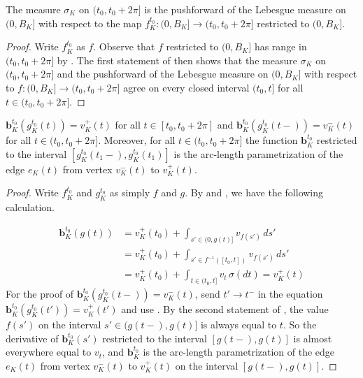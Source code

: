 \begin{lemma}

The measure \(\sigma_K\) on \((t_0, t_0 + 2 \pi]\) is the pushforward of the Lebesgue measure on \((0, B_K]\) with respect to the map \(f_{K}^{t_0} : (0, B_K] \to (t_0, t_0 + 2 \pi]\) restricted to \((0, B_K]\).

\label{lem:parametrization-pushforward}
\end{lemma}

\begin{proof}
Write \(f_K^{t_0}\) as \(f\). Observe that \(f\) restricted to \((0, B_K]\) has range in \((t_0, t_0 + 2\pi]\) by . The first statement of  then shows that the measure \(\sigma_K\) on \((t_0, t_0 + 2 \pi]\) and the pushforward of the Lebesgue measure on \((0, B_K]\) with respect to \(f : (0, B_K] \to (t_0, t_0 + 2 \pi]\) agree on every closed interval \((t_0, t]\) for all \(t \in (t_0, t_0 + 2\pi]\).
\end{proof}

\begin{lemma}

\(\mathbf{b}_{K}^{t_0}(g_{K}^{t_0}(t)) = v_{K}^+(t)\) for all \(t \in [t_0, t_0 + 2\pi]\) and \(\mathbf{b}_{K}^{t_0}(g_{K}^{t_0}(t-)) = v_{K}^-(t)\) for all \(t \in (t_0, t_0 + 2\pi]\). Moreover, for all \(t \in (t_0, t_0 + 2\pi]\) the function \(\mathbf{b}_{K}^{t_0}\) restricted to the interval \([g_{K}^{t_0}(t_1-), g_{K}^{t_0}(t_1)]\) is the arc-length parametrization of the edge \(e_K(t)\) from vertex \(v_K^-(t)\) to \(v_K^+(t)\).

\label{lem:parametrization-vertex}
\end{lemma}

\begin{proof}
Write \(f_K^{t_0}\) and \(g_K^{t_0}\) as simply \(f\) and \(g\). By  and , we have the following calculation.

\begin{align*}
\mathbf{b}_{K}^{t_0} (g(t)) & = v_K^+(t_0) + \int_{s' \in (0, g(t)]} v_{f(s')} \, ds' \\
& = v_K^+(t_0) + \int_{s' \in f^{-1}([t_0, t])} v_{f(s')} \, ds' \\
& = v_K^+(t_0) + \int_{t \in(t_0, t]} v_t \, \sigma(dt) = v^+_K(t)
\end{align*}
For the proof of \(\mathbf{b}_{K}^{t_0}(g_{K}^{t_0}(t-)) = v_{K}^-(t)\), send \(t' \to t^-\) in the equation \(\mathbf{b}_{K}^{t_0}(g_{K}^{t_0}(t')) = v_{K}^+(t')\) and use . By the second statement of , the value \(f(s')\) on the interval \(s' \in (g(t-), g(t)]\) is always equal to \(t\). So the derivative of \(\mathbf{b}_K^{t_0}(s')\) restricted to the interval \([g(t-), g(t)]\) is almost everywhere equal to \(v_t\), and \(\mathbf{b}_{K}^{t_0}\) is the arc-length parametrization of the edge \(e_K(t)\) from vertex \(v_K^-(t)\) to \(v_K^+(t)\) on the interval \([g(t-), g(t)]\).
\end{proof}

